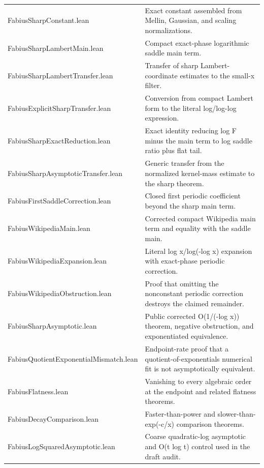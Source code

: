 \documentclass[11pt,a4paper,openany]{book}
\def\module#1{#1.lean}
\newcommand{\module}[1]{\nolinkurl{#1.lean}}
\begin{document}
\begin{longtable}{@{}>{\raggedright\arraybackslash}p{}p{}@{}}
\addlinespace[.28em]
\module{FabiusSharpConstant} & Exact constant assembled from Mellin, Gaussian, and scaling normalizations. \\
\addlinespace[.28em]
\module{FabiusSharpLambertMain} & Compact exact-phase logarithmic saddle main term. \\
\addlinespace[.28em]
\module{FabiusSharpLambertTransfer} & Transfer of sharp Lambert-coordinate estimates to the small-x filter. \\
\addlinespace[.28em]
\module{FabiusExplicitSharpTransfer} & Conversion from compact Lambert form to the literal log/log-log expression. \\
\addlinespace[.28em]
\module{FabiusSharpExactReduction} & Exact identity reducing log F minus the main term to log saddle ratio plus flat tail. \\
\addlinespace[.28em]
\module{FabiusSharpAsymptoticTransfer} & Generic transfer from the normalized kernel-mass estimate to the sharp theorem. \\
\addlinespace[.28em]
\module{FabiusFirstSaddleCorrection} & Closed first periodic coefficient beyond the sharp main term. \\
\addlinespace[.28em]
\module{FabiusWikipediaMain} & Corrected compact Wikipedia main term and equality with the saddle main. \\
\addlinespace[.28em]
\module{FabiusWikipediaExpansion} & Literal log x/log(-log x) expansion with exact-phase periodic correction. \\
\addlinespace[.28em]
\module{FabiusWikipediaObstruction} & Proof that omitting the nonconstant periodic correction destroys the claimed remainder. \\
\addlinespace[.28em]
\module{FabiusSharpAsymptotic} & Public corrected O(1/(-log x)) theorem, negative obstruction, and exponentiated equivalence. \\
\addlinespace[.28em]
\module{FabiusQuotientExponentialMismatch} & Endpoint-rate proof that a quotient-of-exponentials numerical fit is not asymptotically equivalent. \\
\addlinespace[.28em]
\module{FabiusFlatness} & Vanishing to every algebraic order at the endpoint and related flatness theorems. \\
\addlinespace[.28em]
\module{FabiusDecayComparison} & Faster-than-power and slower-than-exp(-c/x) comparison theorems. \\
\addlinespace[.28em]
\module{FabiusLogSquaredAsymptotic} & Coarse quadratic-log asymptotic and O(t log t) control used in the draft audit. \\

\end{longtable}
\end{document}
